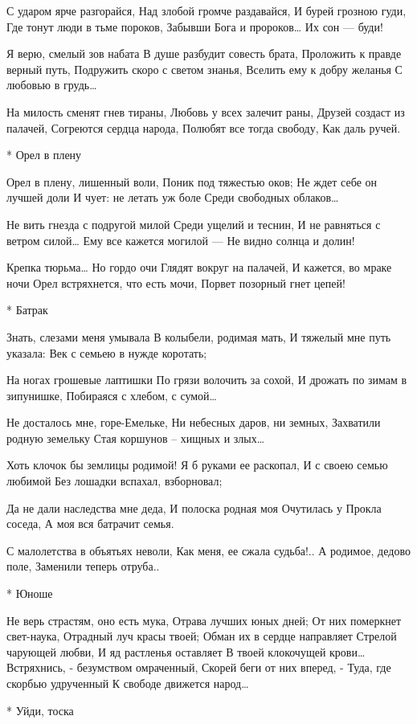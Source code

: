 С ударом ярче разгорайся,
Над злобой громче раздавайся,
И бурей грозною гуди,
Где тонут люди в тьме пороков,
Забывши Бога и пророков…
Их сон — буди!

Я верю, смелый зов набата
В душе разбудит совесть брата,
Проложить к правде верный путь,
Подружить скоро с светом знанья,
Вселить ему к добру желанья
С любовью в грудь…

На милость сменят гнев тираны,
Любовь у всех залечит раны,
Друзей создаст из палачей,
Согреются сердца народа,
Полюбят все тогда свободу,
Как даль ручей.


* Орел в плену

Орел в плену, лишенный воли,
Поник под тяжестью оков;
Не ждет себе он лучшей доли
И чует: не летать уж боле
Среди свободных облаков…

Не вить гнезда с подругой милой
Среди ущелий и теснин,
И не равняться с ветром силой…
Ему все кажется могилой —
Не видно солнца и долин!

Крепка тюрьма… Но гордо очи
Глядят вокруг на палачей,
И кажется, во мраке ночи
Орел встряхнется, что есть мочи,
Порвет позорный гнет цепей!


* Батрак

Знать, слезами меня умывала
В колыбели, родимая мать,
И тяжелый мне путь указала:
Век с семьею в нужде коротать;

На ногах грошевые лаптишки
По грязи волочить за сохой,
И дрожать по зимам в зипунишке,
Побираяся с хлебом, с сумой…

Не досталось мне, горе-Емельке,
Ни небесных даров, ни земных,
Захватили родную земельку
Стая коршунов – хищных и злых…

Хоть клочок бы землицы родимой!
Я б руками ее раскопал,
И с своею семью любимой
Без лошадки вспахал, взборновал;

Да не дали наследства мне деда,
И полоска родная моя
Очутилась у Прокла соседа,
А моя вся батрачит семья.

С малолетства в объятьях неволи,
Как меня, ее сжала судьба!..
А родимое, дедово поле,
Заменили теперь отруба..


* Юноше

Не верь страстям, оно есть мука,
Отрава лучших юных дней;
От них померкнет свет-наука,
Отрадный луч красы твоей;
Обман их в сердце направляет
Стрелой чарующей любви,
И яд растленья оставляет
В твоей клокочущей крови…
Встряхнись, - безумством омраченный,
Скорей беги от них вперед, -
Туда, где скорбью удрученный
К свободе движется народ…


* Уйди, тоска

